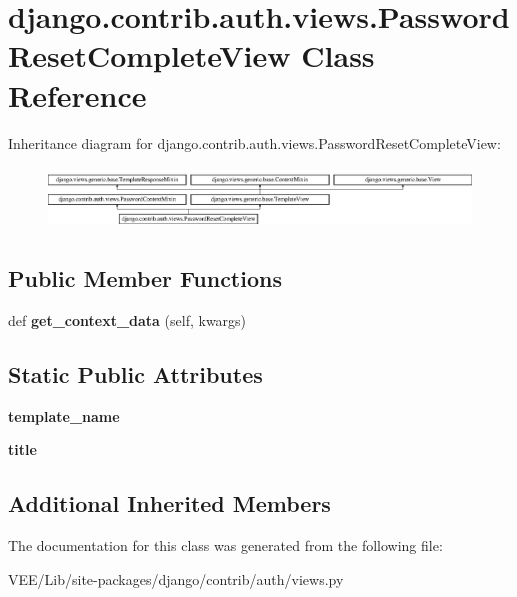 \hypertarget{classdjango_1_1contrib_1_1auth_1_1views_1_1_password_reset_complete_view}{}\section{django.\+contrib.\+auth.\+views.\+Password\+Reset\+Complete\+View Class Reference}
\label{classdjango_1_1contrib_1_1auth_1_1views_1_1_password_reset_complete_view}
Inheritance diagram for django.\+contrib.\+auth.\+views.\+Password\+Reset\+Complete\+View\+:\begin{figure}[H]
\begin{center}
\leavevmode
\includegraphics[height=1.671642cm]{classdjango_1_1contrib_1_1auth_1_1views_1_1_password_reset_complete_view}
\end{center}
\end{figure}
\subsection*{Public Member Functions}
\begin{DoxyCompactItemize}
\item 
\mbox{\label{classdjango_1_1contrib_1_1auth_1_1views_1_1_password_reset_complete_view_a5182331b7016d6fa87a68a40aa188802}} 
def {\bfseries get\+\_\+context\+\_\+data} (self, kwargs)
\end{DoxyCompactItemize}
\subsection*{Static Public Attributes}
\begin{DoxyCompactItemize}
\item 
\mbox{\label{classdjango_1_1contrib_1_1auth_1_1views_1_1_password_reset_complete_view_af57782ece3c6ab8a2ac3c34a99d7fe9a}} 
{\bfseries template\+\_\+name}
\item 
\mbox{\label{classdjango_1_1contrib_1_1auth_1_1views_1_1_password_reset_complete_view_ab702ff245c39adc9a6f3408bd8c9f108}} 
{\bfseries title}
\end{DoxyCompactItemize}
\subsection*{Additional Inherited Members}


The documentation for this class was generated from the following file\+:\begin{DoxyCompactItemize}
\item 
V\+E\+E/\+Lib/site-\/packages/django/contrib/auth/views.\+py\end{DoxyCompactItemize}
